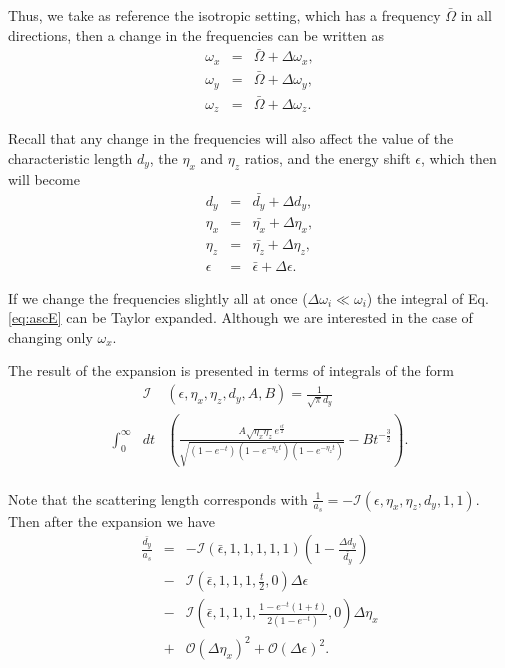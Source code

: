 \documentclass[aps,pre,twocolumn,superscriptaddress,showpacs]{revtex4-1}
\begin{document}
Thus, we take as reference the isotropic setting, which has a frequency $\bar{\Omega}$ in all directions, then a change in the frequencies can be written as
\begin{eqnarray}
\omega_x &=& \bar{\Omega} + \Delta \omega_x, \\
\omega_y &=& \bar{\Omega} + \Delta \omega_y, \\
\omega_z &=& \bar{\Omega} + \Delta \omega_z.
\label{eq:perturbation variables}
\end{eqnarray}

Recall that any change in the frequencies will also affect the value of the characteristic length $d_y$, the $\eta_x$ and $\eta_z$ ratios, and the energy shift $\epsilon$, which then will become
\begin{eqnarray}
d_y &=& \bar{d_y} + \Delta d_y, \\
\eta_x &=& \bar{\eta_x} + \Delta \eta_x, \\
\eta_z &=& \bar{\eta_z} + \Delta \eta_z, \\
\epsilon &=& \bar{\epsilon} + \Delta \epsilon. 
\label{eq:perturbation variables 2 }
\end{eqnarray}

If we change the frequencies slightly all at once ($\Delta \omega_i \ll \omega_i $) the integral of Eq. \eqref{eq:ascE} can be Taylor expanded. Although we are interested in the case of changing only $\omega_x$. 

The result of the expansion is presented in terms of integrals of the form 
\begin{eqnarray}
&\mathcal{I}&(\epsilon, \eta_x, \eta_z, d_y, A, B) = \frac{1}{\sqrt{\pi}d_y} \nonumber \\
\int^\infty_0 &dt& \left( \frac{A\sqrt{\eta_x \eta_z} e^{\frac{\epsilon t}{2}}}{\sqrt{(1 - e^{-t}) (1 - e^{-\eta_x t}) (1 - e^{-\eta_z t})} } - Bt^{-\frac{3}{2}}\right). \nonumber \\
\label{eq:Integral perturbation}
\end{eqnarray}

Note that the scattering length corresponds with $\frac{1}{a_s} = - \mathcal{I}(\epsilon, \eta_x, \eta_z, d_y, 1, 1)$. Then after the expansion we have
\begin{eqnarray}
\frac{\bar{d_y}}{a_s} &=& - \mathcal{I}(\bar{\epsilon}, 1, 1, 1, 1, 1) \left( 1-\frac{\Delta d_y}{\bar{d_y}}\right) \nonumber \\
&-& \mathcal{I}\left(\bar{\epsilon}, 1, 1, 1, \frac{t}{2}, 0 \right) \Delta \epsilon \nonumber \\
&-&  \mathcal{I}\left(\bar{\epsilon}, 1, 1, 1, \frac{1 - e^{-t}(1+t)}{2(1-e^{-t})}, 0 \right) \Delta \eta_x \nonumber \\
&+& \mathcal{O}(\Delta \eta_x)^2 + \mathcal{O} (\Delta \epsilon)^2.
\label{eq:result perturbation}
\end{eqnarray}
\end{document}
